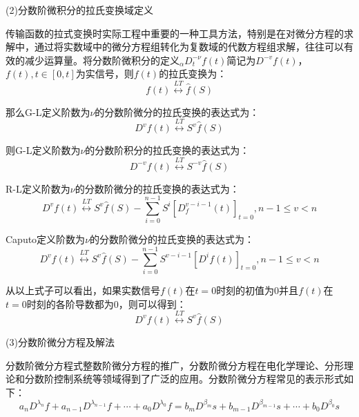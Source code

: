 (2)分数阶微积分的拉氏变换域定义

传输函数的拉式变换时实际工程中重要的一种工具方法，特别是在对微分方程的求解中，通过将实数域中的微分方程组转化为复数域的代数方程组求解，往往可以有效的减少运算量。将分数阶微积分的定义${}_{\alpha }D_{t}^{-\nu }f(t)$简记为${{D}^{-v}}f(t)$，$f(t),t\in \left[ 0,t \right]$为实信号，则$f(t)$的拉氏变换为：
\begin{equation}
f(t)\overset{LT}{\longleftrightarrow}\widehat{f}\left( S \right)
\end{equation}

那么G-L定义阶数为$\nu $的分数阶微分的拉氏变换的表达式为：
\begin{equation}
{{D}^{v}}f(t)\overset{LT}{\longleftrightarrow}{{S}^{v}}\widehat{f}\left( S \right)
\end{equation}

则G-L定义阶数为$\nu $的分数阶积分的拉氏变换的表达式为：
\begin{equation}
{{D}^{-v}}f(t)\overset{LT}{\longleftrightarrow}{{S}^{-v}}\widehat{f}\left( S \right)
\end{equation}
	 
R-L定义阶数为$\nu $的分数阶微分的拉氏变换的表达式为：
\begin{equation}
{{D}^{v}}f(t)\overset{LT}{\longleftrightarrow}{{S}^{v}}\widehat{f}\left( S \right)-\sum\limits_{i=0}^{n-1}{{{S}^{i}}{{\left[ D_{f}^{v-i-1}\left( t \right) \right]}_{t=0}},n-1\le v<n}
\end{equation}
	 
Caputo定义阶数为$\nu $的分数阶微分的拉氏变换的表达式为：
\begin{equation}
{{D}^{v}}f(t)\overset{LT}{\longleftrightarrow}{{S}^{v}}\widehat{f}\left( S \right)-\sum\limits_{i=0}^{n-1}{{{S}^{v-i-1}}{{\left[ {{D}^{i}}f\left( t \right) \right]}_{t=0}},n-1\le v<n}
\end{equation}
	 
从以上式子可以看出，如果实数信号$f(t)$在$t=0$时刻的初值为0并且$f(t)$在$t=0$时刻的各阶导数都为0，则可以得到：
\begin{equation}
{{D}^{v}}f(t)\overset{LT}{\longleftrightarrow}{{S}^{v}}\widehat{f}\left( S \right)
\end{equation}

(3)分数阶微分方程及解法

分数阶微分方程式整数阶微分方程的推广，分数阶微分方程在电化学理论、分形理论和分数阶控制系统等领域得到了广泛的应用。分数阶微分方程常见的表示形式如下：
\begin{equation}
{{a}_{n}}{{D}^{{{\lambda }_{n}}}}f+{{a}_{n-1}}{{D}^{{{\lambda }_{n-1}}}}f+\cdots +{{a}_{0}}{{D}^{{{\lambda }_{0}}}}f={{b}_{m}}{{D}^{{{\beta }_{m}}}}s+{{b}_{m-1}}{{D}^{{{\beta }_{m-1}}}}s+\cdots +{{b}_{0}}{{D}^{{{\beta }_{0}}}}s
\end{equation}

